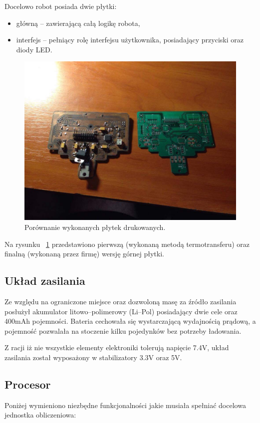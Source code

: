 Docelowo robot posiada dwie płytki:
\begin{itemize}
\item główną – zawierającą całą logikę robota,
\item interfejs – pełniący rolę interfejsu użytkownika, posiadający przyciski oraz diody LED.
\end{itemize}


\begin{figure}[H]
	\centering
		\includegraphics[width=0.75\linewidth]{pic04/boards.JPG}
	\caption{Porównanie wykonanych płytek drukowanych.}
	\label{fig:boards}	
\end{figure}

Na rysunku ~\ref{fig:boards} przedstawiono pierwszą  (wykonaną metodą termotransferu) oraz finalną (wykonaną przez firmę) wersję górnej płytki.  

\subsection{Układ zasilania}
Ze względu na ograniczone miejsce oraz dozwoloną masę za źródło zasilania posłużył akumulator litowo–polimerowy (Li–Pol) posiadający dwie cele oraz 400mAh pojemności. Bateria cechowała się wystarczającą wydajnością prądową, a pojemność pozwalała na stoczenie kilku pojedynków bez potrzeby ładowania. 

Z racji iż nie wszystkie elementy elektroniki tolerują napięcie 7.4V, układ zasilania został wyposażony w stabilizatory 3.3V oraz 5V. 

\subsection{Procesor}
Poniżej wymieniono niezbędne funkcjonalności jakie musiała spełniać docelowa jednostka obliczeniowa:

